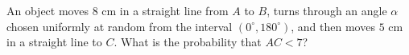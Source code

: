 An object moves $8$ cm in a straight line from $A$ to $B$, turns through an angle $\alpha$ chosen uniformly at random from the interval $\left(0^\circ,180^\circ\right)$, and then moves $5$ cm in a straight line to $C$. What is the probability that $AC<7$?
